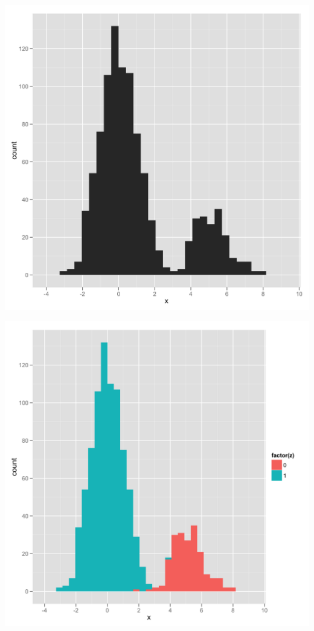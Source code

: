 \documentclass{beamer}
\begin{document}
\begin{frame}[fragile]
  \begin{center}
    \includegraphics[scale = 0.1]{../graphs/mixture_models/blind_histogram.png}
  \end{center}
\end{frame}

\begin{frame}[fragile]
  \begin{center}
    \includegraphics[scale = 0.1]{../graphs/mixture_models/labelled_histogram.png}
  \end{center}
\end{frame}
\end{document}
